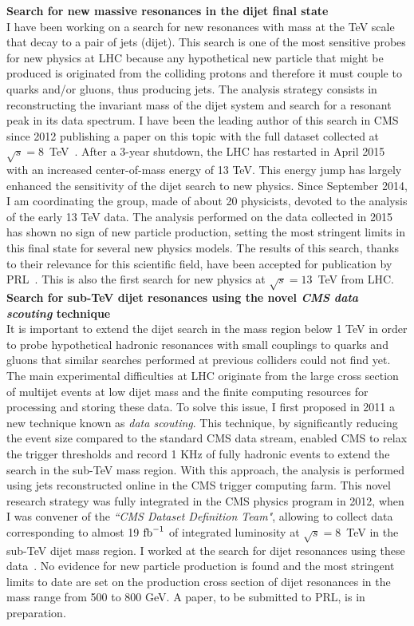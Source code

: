 \documentclass[10pt, a4paper]{article}
\begin{document}
{\bf Search for new massive resonances in the dijet final state}\\[0.5em]
I have been working on a search for new resonances with mass at the TeV
scale that decay to a pair of jets (dijet). This search is one of the most 
sensitive probes for new physics at LHC because any hypothetical new
particle that might be produced is originated from the
colliding protons and therefore it must couple to quarks and/or
gluons, thus producing jets. The analysis strategy consists in
reconstructing the invariant mass of the dijet system and search for a
resonant peak in its data spectrum. I have been the leading author of this
search in CMS since 2012 publishing a paper on this topic with the
full dataset collected at $\sqrt{s}=8$~TeV~\cite{Khachatryan:2015sja}. After a 3-year
shutdown, the LHC has restarted in April 2015 with an increased 
center-of-mass energy of 13 TeV. This energy jump has largely enhanced the
sensitivity of the dijet search to new physics. Since September 2014, I
am coordinating the group, made of about 20 physicists, devoted to the
analysis of the early 13 TeV data. The analysis performed on the data
collected in 2015 has shown no sign of new particle
production, setting the most stringent limits in this final state for several new physics
models. The results of this search, thanks to their
relevance for this scientific 
field, have been accepted for publication by PRL~\cite{Khachatryan:2015dcf}. 
This is also the first search for new physics at $\sqrt{s}=13$~TeV from LHC. \\[1em]

{\bf Search for sub-TeV dijet resonances using the novel {\it CMS data scouting} technique}\\[0.5em]
It is important to extend the dijet search in the
mass region below 1 TeV in order to probe hypothetical hadronic resonances with small
couplings to quarks and gluons that similar searches performed at previous
colliders could not find yet. The main experimental difficulties at LHC originate
from the large cross section of multijet events at low dijet mass 
and the finite computing resources for processing and storing these
data. To solve this issue, I first proposed in 2011 a new technique known as 
{\it data scouting}. This technique, by significantly reducing the event size
compared to the standard CMS data stream, enabled CMS to relax the
trigger thresholds and record 1 KHz of fully hadronic events to extend
the search in the sub-TeV mass region. With this approach, the
analysis is performed using jets reconstructed online in the CMS
trigger computing farm. 
This novel research strategy was fully integrated in the CMS physics program in
2012, when I was convener of the {\it``CMS Dataset Definition Team"}, 
allowing to collect data corresponding to almost 19 $\rm{fb}^{-1}$ of
integrated luminosity at $\sqrt{s}=8$~TeV in the sub-TeV dijet mass region. 
I worked at the search for dijet resonances using these data~\cite{CMS:2015neg}.  
No evidence for new particle production is found and the most
stringent limits to date are set on the production cross section of dijet resonances
in the mass range from 500 to 800 GeV. A paper, to be submitted to PRL, is 
in preparation. \\ [1em]
\end{document}

